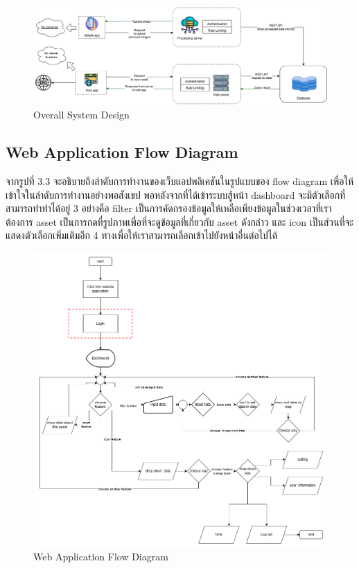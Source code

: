 \begin{figure}[ht]
  \begin{center}
  \includegraphics[scale=0.45]{resources/SystemDesign.png}
  \end{center}
  \caption[System Design]{Overall System Design}
  \label{fig:system design}
\end{figure}

\newpage
\subsection{Web Application Flow Diagram}
จากรูปที่ 3.3 จะอธิบายถึงลำดับการทำงานของเว็บแอปพลิเคชันในรูปแบบของ flow diagram เพื่อให้เข้าใจในลำดับการทำงานอย่างพอสังเขป 
พอหลังจากที่ได้เข้าระบบสู้หน้า dashboard จะมีตัวเลือกที่สามารถทำทำได้อยู่ 3 อย่างคือ filter เป็นการคัดกรองข้อมูลให้เหลือเพียงข้อมูลในช่วงเวลาที่เราต้องการ 
asset เป็นการกดที่รูปภาพเพื่อที่จะดูข้อมูลที่เกี่ยวกับ asset ดังกล่าว และ icon เป็นส่วนที่จะแสดงตัวเลือกเพิ่มเติมอีก 4 ทางเพื่อให้เราสามารถเลือกเข้าไปยังหน้าอื่นต่อไปได้

\begin{figure}[ht]
  \begin{center}
  \includegraphics[scale=0.65]{resources/WebsiteFlow.png}
  \end{center}
  \caption[Web Application Flow Diagram]{Web Application Flow Diagram}
  \label{fig:web-app flow design}
\end{figure}

